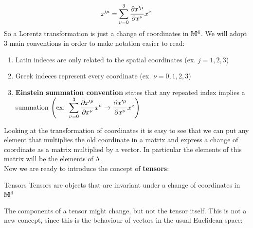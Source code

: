 \begin{equation}
  x'^{\mu} = \bigsum_{\nu = 0}^{3} \pdv{x'^{\mu}}{x^{\nu}} x^{\nu}
\end{equation}
So a Lorentz transformation is just a change of coordinates in $\mathbb{M}^4$. We will adopt 3 main conventions in order to make notation easier to read:
\begin{enumerate}
  \item Latin indeces are only related to the spatial coordinates (ex. $j=1,2,3$)
  \item Greek indeces represent every coordinate (ex. $\nu=0,1,2,3$)
  \item \textbf{Einstein summation convention} states that any repeated index implies a summation $\brackets{\text{ex. } \bigsum_{\nu = 0}^{3} \pdv{x'^{\mu}}{x^{\nu}} x^{\nu} \rightarrow \pdv{x'^{\mu}}{x^{\nu}} x^{\nu}}$
\end{enumerate}
Looking at the transformation of coordinates it is easy to see that we can put any element that multiplies the old coordinate in a matrix and express a change of coordinate as a matrix multiplied by a vector. In particular the elements of this matrix will be the elements of $\Lambda$.\\
Now we are ready to introduce the concept of \textbf{tensors}:
\begin{definition}{Tensors}
  Tensors are objects that are invariant under a change of coordinates in $\mathbb{M}^4$
\end{definition}
The components of a tensor might change, but not the tensor itself. This is not a new concept, since this is the behaviour of vectors in the usual Euclidean space:

